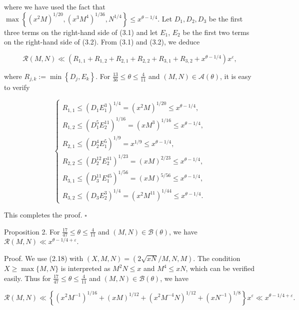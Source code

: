 \documentclass[10pt]{article}
\begin{document}
where we have used the fact that $\max \left\{\left(x^{2} M\right)^{1 / 20},\left(x^{3} M^{4}\right)^{1 / 36}, N^{1 / 4}\right\} \leqslant x^{\theta-1 / 4}$.
Let $D_{1}, D_{2}, D_{3}$ be the first three terms on the right-hand side of (3.1) and let $E_{1}$, $E_{2}$ be the first two terms on the right-hand side of (3.2). From (3.1) and (3.2), we deduce

$$
\mathscr{R}(M, N) \ll\left(R_{1,1}+R_{1,2}+R_{2,1}+R_{2,2}+R_{3,1}+R_{3,2}+x^{\theta-1 / 4}\right) x^{\varepsilon},
$$

where $R_{j, k}:=\min \left\{D_{j}, E_{k}\right\}$. For $\frac{13}{36} \leqslant \theta \leqslant \frac{4}{11}$ and $(M, N) \in \mathscr{A}(\theta)$, it is easy to verify

$$
\left\{\begin{array}{l}
R_{1,1} \leqslant\left(D_{1} E_{1}^{3}\right)^{1 / 4}=\left(x^{2} M\right)^{1 / 20} \leqslant x^{\theta-1 / 4}, \\
R_{1,2} \leqslant\left(D_{1}^{5} E_{2}^{11}\right)^{1 / 16}=\left(x M^{3}\right)^{1 / 16} \leqslant x^{\theta-1 / 4}, \\
R_{2,1} \leqslant\left(D_{2}^{4} E_{1}^{5}\right)^{1 / 9}=x^{1 / 9} \leqslant x^{\theta-1 / 4}, \\
R_{2,2} \leqslant\left(D_{2}^{12} E_{2}^{11}\right)^{1 / 23}=(x M)^{2 / 23} \leqslant x^{\theta-1 / 4}, \\
R_{3,1} \leqslant\left(D_{3}^{11} E_{1}^{45}\right)^{1 / 56}=(x M)^{5 / 56} \leqslant x^{\theta-1 / 4}, \\
R_{3,2} \leqslant\left(D_{3} E_{2}^{3}\right)^{1 / 4}=\left(x^{2} M^{11}\right)^{1 / 44} \leqslant x^{\theta-1 / 4} .
\end{array}\right.
$$

This completes the proof. \(\square\)

Proposition 2. For $\frac{17}{47} \leqslant \theta \leqslant \frac{4}{11}$ and $(M, N) \in \mathscr{B}(\theta)$, we have $\mathscr{R}(M, N) \ll x^{\theta-1 / 4+\varepsilon}$.

Proof. We use (2.18) with $(X, M, N)=(2 \sqrt{x N} / M, N, M)$. The condition $X \geqslant \max \{M, N\}$ is interpreted as $M^{2} N \leqslant x$ and $M^{4} \leqslant x N$, which can be verified easily. Thus for $\frac{17}{47} \leqslant \theta \leqslant \frac{4}{11}$ and $(M, N) \in \mathscr{B}(\theta)$, we have

$$
\mathscr{R}(M, N) \ll\left\{\left(x^{2} M^{-1}\right)^{1 / 16}+(x M)^{1 / 12}+\left(x^{2} M^{-4} N\right)^{1 / 12}+\left(x N^{-1}\right)^{1 / 8}\right\} x^{\varepsilon} \ll x^{\theta-1 / 4+\varepsilon} .
$$
\end{document}
